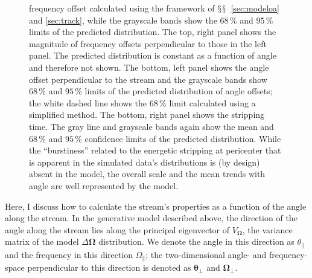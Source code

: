 \documentclass[12pt,preprint]{aastex}
\newcommand{\sectionname}{$\mathsection$}
\renewcommand{\vec}[1]{\ensuremath{\mathbf{#1}}}
\newcommand{\veco}{\ensuremath{\vec{\Omega}}}
\newcommand{\veca}{\ensuremath{\boldsymbol\theta}}
\newcommand{\apar}{\ensuremath{\theta_\parallel}}
\newcommand{\opar}{\ensuremath{\Omega_\parallel}}
\newcommand{\aperp}{\ensuremath{\veca_\perp}}
\newcommand{\operp}{\ensuremath{\veco_\perp}}
\begin{document}
\begin{figure}[t!]
{    frequency offset calculated using the framework of
    \sectionname\sectionname~\ref{sec:modeloa} and \ref{sec:track},
    while the grayscale bands show the $68\,\%$ and $95\,\%$ limits of
    the predicted distribution. The top, right panel shows the
    magnitude of frequency offsets perpendicular to those in the left
    panel. The predicted distribution is constant as a function of
    angle and therefore not shown. The bottom, left panel shows the
    angle offset perpendicular to the stream and the grayscale bands
    show $68\,\%$ and $95\,\%$ limits of the predicted distribution of
    angle offsets; the white dashed line shows the $68\,\%$ limit
    calculated using a simplified method. The bottom, right panel
    shows the stripping time. The gray line and grayscale bands again
    show the mean and $68\,\%$ and $95\,\%$ confidence limits of the
    predicted distribution. While the ``burstiness'' related to the
    energetic stripping at pericenter that is apparent in the
    simulated data's distributions is (by design) absent in the model,
    the overall scale and the mean trends with angle are well
    represented by the model.}\label{fig:gd1_apar}
\end{figure}

Here, I discuss how to calculate the stream's properties as a function
of the angle along the stream. In the generative model described
above, the direction of the angle along the stream lies along the
principal eigenvector of $V_\veco$, the variance matrix of the model
$\Delta \veco$ distribution. We denote the angle in this direction as
$\apar$ and the frequency in this direction $\opar$; the
two-dimensional angle- and frequency-space perpendicular to this
direction is denoted as $\aperp$ and $\operp$. 
\end{document}
